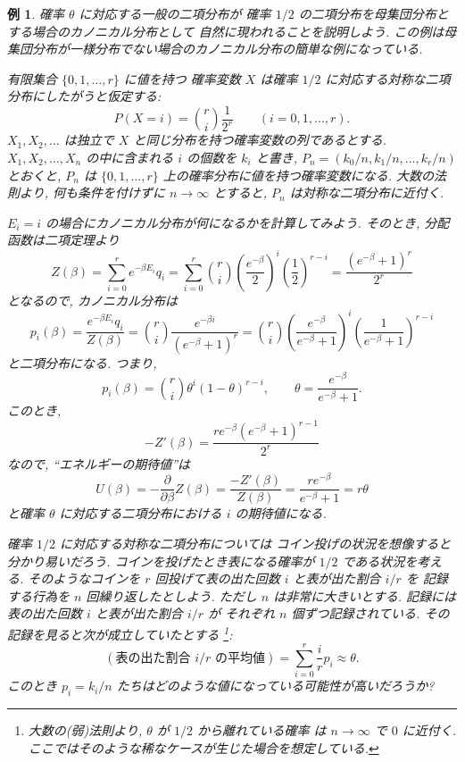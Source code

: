 \documentclass[12pt,twoside]{jarticle}
\renewcommand\d{\partial}
\theoremstyle{jplain}
\newtheorem{example}[theorem]{例}
\theoremstyle{jplain}
\theoremstyle{jplain}
\numberwithin{theorem}{section}
\numberwithin{equation}{section}
\numberwithin{figure}{section}
\numberwithin{table}{section}
\begin{document}
\begin{example}
\label{example:binom-Gibbs}
確率 $\theta$ に対応する一般の二項分布が
確率 $1/2$ の二項分布を母集団分布とする場合のカノニカル分布として
自然に現われることを説明しよう. 
この例は母集団分布が一様分布でない場合のカノニカル分布の簡単な例になっている.

有限集合 $\{0,1,\ldots,r\}$ に値を持つ
確率変数 $X$ は確率 $1/2$ に対応する対称な二項分布にしたがうと仮定する:
\[
P(X=i)=\binom{r}{i}\frac{1}{2^r}
\qquad (i=0,1,\ldots,r).
\]
$X_1,X_2,\ldots$ は独立で $X$ と同じ分布を持つ確率変数の列であるとする.
$X_1,X_2,\ldots,X_n$ の中に含まれる $i$ の個数を $k_i$ と書き, 
$P_n=(k_0/n,k_1/n,\ldots,k_r/n)$ とおくと, 
$P_n$ は $\{0,1,\ldots,r\}$ 上の確率分布に値を持つ確率変数になる.
大数の法則より, 何も条件を付けずに $n\to\infty$ とすると, 
$P_n$ は対称な二項分布に近付く.

$E_i=i$ の場合にカノニカル分布が何になるかを計算してみよう. 
そのとき, 分配函数は二項定理より
\[
Z(\beta)
=\sum_{i=0}^r e^{-\beta E_i}q_i
=\sum_{i=0}^r \binom{r}{i}\left(\frac{e^{-\beta}}{2}\right)^i\left(\frac{1}{2}\right)^{r-i}
=\frac{(e^{-\beta}+1)^r}{2^r}
\] 
となるので, カノニカル分布は
\[
p_i(\beta)
=\frac{e^{-\beta E_i}q_i}{Z(\beta)}
=\binom{r}{i}\frac{e^{-\beta i}}{(e^{-\beta}+1)^r}
=\binom{r}{i}
\left(\frac{e^{-\beta}}{e^{-\beta}+1}\right)^i
\left(\frac{1}{e^{-\beta}+1}\right)^{r-i}
\]
と二項分布になる. つまり, 
\[
p_i(\beta)=\binom{r}{i}\theta^i(1-\theta)^{r-i},
\qquad
\theta=\frac{e^{-\beta}}{e^{-\beta}+1}.
\]
このとき,
\[
-Z'(\beta)=\frac{r e^{-\beta}(e^{-\beta}+1)^{r-1}}{2^r}
\]
なので, ``エネルギーの期待値''は
\[
U(\beta)
=-\frac{\d}{\d\beta}Z(\beta)
=\frac{-Z'(\beta)}{Z(\beta)}
=\frac{r e^{-\beta}}{e^{-\beta}+1}
=r\theta
\]
と確率 $\theta$ に対応する二項分布における $i$ の期待値になる.

確率 $1/2$ に対応する対称な二項分布については
コイン投げの状況を想像すると分かり易いだろう. 
コインを投げたとき表になる確率が $1/2$ である状況を考える.
そのようなコインを $r$ 回投げて表の出た回数 $i$ と表が出た割合 $i/r$ を
記録する行為を $n$ 回繰り返したとしよう.
ただし $n$ は非常に大きいとする.
記録には表の出た回数 $i$ と表が出た割合 $i/r$ が
それぞれ $n$ 個ずつ記録されている.
その記録を見ると次が成立していたとする%
\footnote{大数の(弱)法則より, $\theta$ が $1/2$ から離れている確率
は $n\to\infty$ で $0$ に近付く.
ここではそのような稀なケースが生じた場合を想定している.}:
\[
(\text{表の出た割合 $i/r$ の平均値})
=\sum_{i=0}^r \frac{i}{r} p_i 
\approx \theta.
\tag{$*$}
\]
このとき $p_i=k_i/n$ たちはどのような値になっている可能性が高いだろうか?


\end{example}
\end{document}
